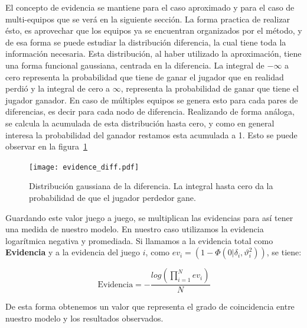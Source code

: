 \documentclass[11pt,twoside,spanish]{report} %
\begin{document}
El concepto de evidencia se mantiene para el caso aproximado y para el caso de multi-equipos que se ver\'a en la siguiente secci\'on.
La forma practica de realizar \'esto, es aprovechar que los equipos ya se encuentran organizados por el m\'etodo, y de esa forma se puede estudiar la distribuci\'on diferencia, la cual tiene toda la informaci\'on necesaria.
Esta distribuci\'on, al haber utilizado la aproximaci\'on, tiene una forma funcional gaussiana, centrada en la diferencia.
La integral de $-\infty$ a cero representa la probabilidad que tiene de ganar el jugador que en realidad perdi\'o y la integral de cero a  $\infty$, representa la probabilidad de ganar que tiene el jugador ganador.
En caso de m\'ultiples equipos se genera esto para cada pares de diferencias, es decir para cada nodo de diferencia.
Realizando de forma an\'aloga, se calcula la acumulada de esta distribuci\'on hasta cero, y como en general interesa la probabilidad del ganador restamos esta acumulada a 1.
Esto se puede observar en la figura~\ref{fig:evidenciadiff}


\begin{figure}[H]
	\centering
	\texttt{[image: evidence\_diff.pdf]}
	\caption{Distribuci\'on gaussiana de la diferencia. La integral hasta cero da la probabilidad de que el jugador perdedor gane.}
	\label{fig:evidenciadiff}
\end{figure}

Guardando este valor juego a juego, se multiplican las evidencias para as\'i tener una medida de nuestro modelo. 
En nuestro caso utilizamos la evidencia logar\'itmica negativa y promediada.
Si llamamos a la evidencia total como \textbf{Evidencia} y a la evidencia del juego $i$, como $ev_i=(1-\Phi(0|\delta_i,\vartheta_i^2))$, se tiene:

\begin{equation}
	\text{Evidencia} = -\frac{log(\prod_{i=1}^{N}ev_i)}{N}
\end{equation}  

De esta forma obtenemos un  valor que representa el grado de coincidencia entre nuestro modelo y los resultados observados.
\end{document}
